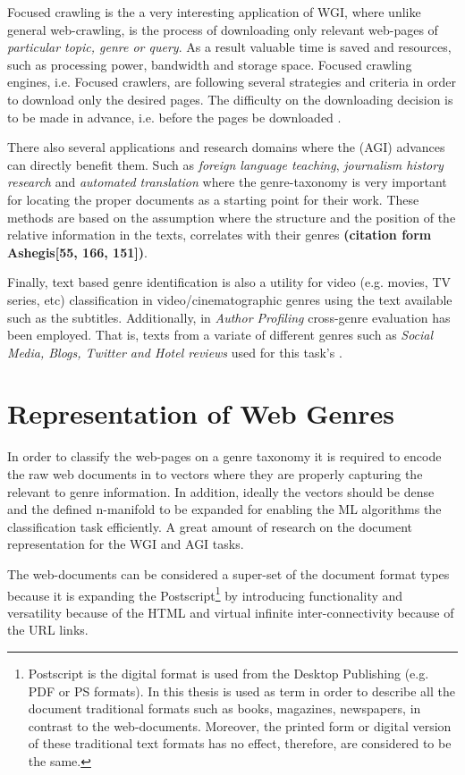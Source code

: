 Focused crawling is the a very interesting application of WGI, where unlike general web-crawling, is the process of downloading only relevant web-pages of \textit{particular topic, genre or query}. As a result valuable time is saved and resources, such as processing power, bandwidth and storage space. Focused crawling engines, i.e. Focused crawlers, are following several strategies and criteria in order to download only the desired pages. The difficulty on the downloading decision is to be made in advance, i.e. before the pages be downloaded \parencite{priyatam2013don_URL} . 

There also several applications and research domains where the (AGI) advances can directly benefit them. Such as \textit{foreign language teaching}, \textit{journalism history research} and \textit{automated translation} where the genre-taxonomy is very important for locating the proper documents as a starting point for their work. These methods are based on the assumption where the structure and the position of the relative information in the texts, correlates with their genres \textbf{(citation form Ashegis[55, 166, 151])}.

Finally, text based genre identification is also a utility for video (e.g. movies, TV series, etc) classification in video/cinematographic genres using the text available such as the subtitles\parencite{lee2017text}. Additionally, in \textit{Author Profiling} cross-genre evaluation has been employed. That is, texts from a variate of different genres such as \textit{Social Media, Blogs, Twitter and Hotel reviews} used for this task's  \parencite{rangel2016overview}. 

\section{Representation of Web Genres} \label{chap:introduction:sec:document_representation}

In order to classify the web-pages on a genre taxonomy it is required to encode the raw web documents in to vectors where they are properly capturing the relevant to genre information. In addition, ideally the vectors should be dense and the defined n-manifold to be expanded for enabling the ML algorithms the classification task efficiently. A great amount of research on the document representation for the WGI and AGI tasks.

The web-documents can be considered a super-set of the document format types because it is expanding the Postscript\footnote{Postscript is the digital format is used from the Desktop Publishing (e.g. PDF or PS formats). In this thesis is used as term in order to describe all the document traditional formats such as books, magazines, newspapers, in contrast to the web-documents. Moreover, the printed form or digital version of these traditional text formats has no effect, therefore, are considered to be the same.} by introducing functionality and versatility because of the HTML and virtual infinite inter-connectivity because of the URL links. 

